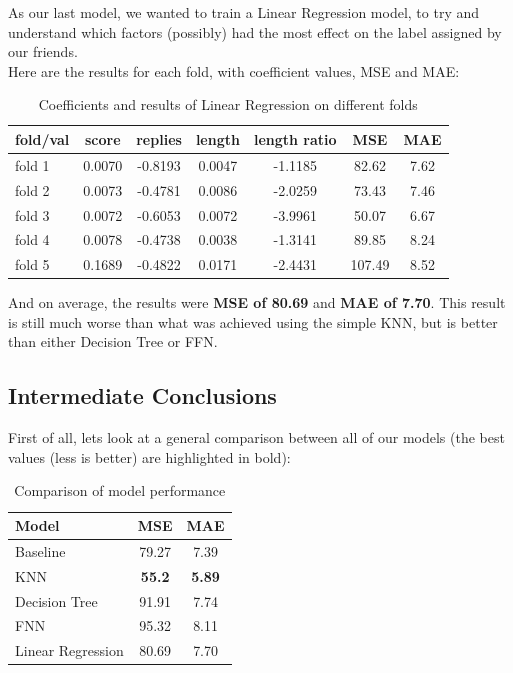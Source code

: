 \documentclass[11pt, oneside]{article}   	%
\begin{document}
As our last model, we wanted to train a Linear Regression model, to try and understand which factors (possibly) had the most effect on the label assigned by our friends.\\
Here are the results for each fold, with coefficient values, MSE and MAE:
\begin{table}[H]
\begin{center}
    \begin{tabular}{|l|c|c|c|c|c|c|}
    \hline
    fold/val & score & replies & length & length ratio & MSE & MAE \\
    \hline
    fold 1 & 0.0070 & -0.8193 & 0.0047 & -1.1185 & 82.62 & 7.62 \\
    fold 2 & 0.0073 & -0.4781 & 0.0086 & -2.0259 & 73.43 & 7.46 \\
    fold 3 & 0.0072 & -0.6053 & 0.0072 & -3.9961 & 50.07 & 6.67 \\
    fold 4 & 0.0078 & -0.4738 & 0.0038 & -1.3141 & 89.85 & 8.24 \\
    fold 5 & 0.1689 & -0.4822 & 0.0171 & -2.4431 & 107.49 & 8.52\\
    \hline
  \end{tabular}
  \caption{Coefficients and results of Linear Regression on different folds}
\end{center}
\end{table}
And on average, the results were \textbf{MSE of 80.69} and \textbf{MAE of 7.70}. This result is still much worse than what was achieved using the simple KNN, but is better than either Decision Tree or FFN.

\subsection{Intermediate Conclusions}
First of all, lets look at a general comparison between all of our models (the best values (less is better) are highlighted in bold):
\begin{table}[H]
  \begin{center}
  \begin{tabular}{|l|c|c|}
    \hline
    Model & MSE & MAE \\
    \hline
    Baseline & 79.27 & 7.39 \\
    KNN & \textbf{55.2} & \textbf{5.89} \\
    Decision Tree & 91.91 & 7.74 \\
    FNN & 95.32 & 8.11 \\
    Linear Regression & 80.69 & 7.70 \\
    \hline
  \end{tabular}
  \caption{Comparison of model performance}
  \end{center}
\end{table}
\end{document}
